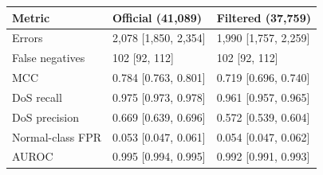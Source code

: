 \begin{tabular}{@{}lll@{}}
\toprule
Metric & Official (41,089) & Filtered (37,759) \\
\midrule
Errors & 2,078 [1,850, 2,354] & 1,990 [1,757, 2,259] \\
False negatives & 102 [92, 112] & 102 [92, 112] \\
MCC & 0.784 [0.763, 0.801] & 0.719 [0.696, 0.740] \\
DoS recall & 0.975 [0.973, 0.978] & 0.961 [0.957, 0.965] \\
DoS precision & 0.669 [0.639, 0.696] & 0.572 [0.539, 0.604] \\
Normal-class FPR & 0.053 [0.047, 0.061] & 0.054 [0.047, 0.062] \\
AUROC & 0.995 [0.994, 0.995] & 0.992 [0.991, 0.993] \\
\bottomrule
\end{tabular}
